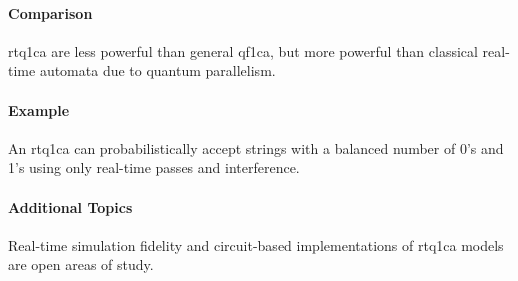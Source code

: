 \paragraph{Comparison}
\gls{rtq1ca} are less powerful than general \gls{qf1ca}, but more powerful than classical real-time automata due to quantum parallelism.

\paragraph{Example}
An \gls{rtq1ca} can probabilistically accept strings with a balanced number of 0's and 1's using only real-time passes and interference.

\paragraph{Additional Topics}
Real-time simulation fidelity and circuit-based implementations of \gls{rtq1ca} models are open areas of study.
